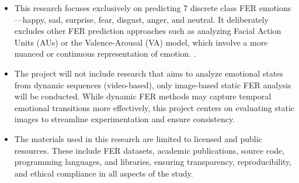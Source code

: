 \begin{itemize}
\item This research focuses exclusively on predicting 7 discrete class FER emotions —happy, sad, surprise, fear, disgust, anger, and neutral. It deliberately excludes other FER prediction approaches such as analyzing Facial Action Units (AUs) or the Valence-Arousal (VA) model, which involve a more nuanced or continuous representation of emotion. \cite{mollahosseini_affectnet_2019}\cite{kollias_affect_2021}.

\item The project will not include research that aims to analyze emotional states from dynamic sequences (video-based)\cite{wang_survey_2024}, only image-based static FER analysis will be conducted. While dynamic FER methods may capture temporal emotional transitions more effectively, this project centers on evaluating static images to streamline experimentation and ensure consistency.

\item The materials used in this research are limited to licensed and public resources. These include FER datasets, academic publications, source code, programming languages, and libraries, ensuring transparency, reproducibility, and ethical compliance in all aspects of the study.
\end{itemize}

